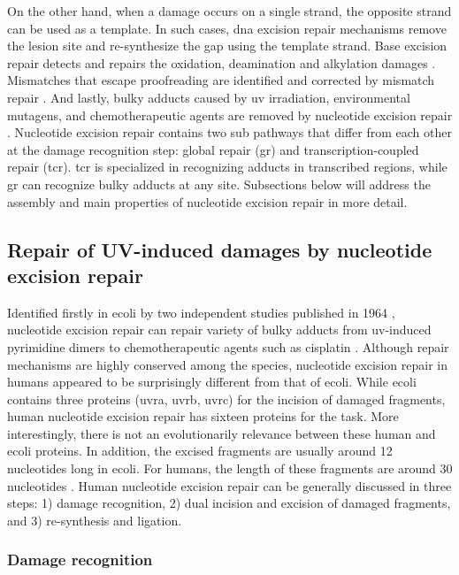 On the other hand, when a damage occurs on a single strand, the opposite strand can be used as a template. In such cases, \gls{dna} excision repair mechanisms remove the lesion site and re-synthesize the gap using the template strand. Base excision repair detects and repairs the oxidation, deamination and alkylation damages \citep{klungland1999base}. Mismatches that escape proofreading are identified and corrected by mismatch repair \citep{modrich1997strand}. And lastly, bulky adducts caused by \gls{uv} irradiation, environmental mutagens, and chemotherapeutic agents are removed by nucleotide excision repair \citep{reardon2005nucleotide}. Nucleotide excision repair contains two sub pathways that differ from each other at the damage recognition step: global repair (\gls{gr}) and transcription-coupled repair (\gls{tcr}). \gls{tcr} is specialized in recognizing adducts in transcribed regions, while \gls{gr} can recognize bulky adducts at any site. Subsections below will address the assembly and main properties of nucleotide excision repair in more detail.  

\subsection{Repair of UV-induced damages by nucleotide excision repair}

Identified firstly in \gls{ecoli} by two independent studies published in 1964 \citep{boyce1964release,setlow1964disappearance}, nucleotide excision repair can repair variety of bulky adducts from \gls{uv}-induced pyrimidine dimers to chemotherapeutic agents such as cisplatin \citep{yimit2019differential}. Although repair mechanisms are highly conserved among the species, nucleotide excision repair in humans appeared to be surprisingly different from that of \gls{ecoli}. While \gls{ecoli} contains three proteins (\gls{uvra}, \gls{uvrb}, \gls{uvrc}) for the incision of damaged fragments, human nucleotide excision repair has sixteen proteins for the task. More interestingly, there is not an evolutionarily relevance between these human and \gls{ecoli} proteins. In addition, the excised fragments are usually around 12 nucleotides long in \gls{ecoli}. For humans, the length of these fragments are around 30 nucleotides \citep{sancar2016mechanisms}. Human nucleotide excision repair can be generally discussed in three steps: 1) damage recognition, 2) dual incision and excision of damaged fragments, and 3) re-synthesis and ligation.  

\subsubsection{Damage recognition}

